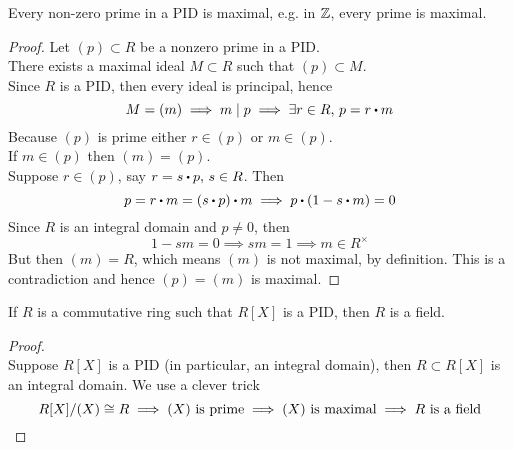 \documentclass[../Main.tex]{subfiles}
\begin{document}
\begin{thm}[title = Nonzero primes ideals are maximal in PID]
	Every non-zero prime in a PID is maximal, e.g. in $\mathbb{Z}$, every prime is maximal.
\end{thm}
\begin{proof}
	Let $(p)\subset R$ be a nonzero prime in a PID.\\
	There exists a maximal ideal $M\subset R $ such that $(p)\subset M$.\\
	Since $R$ is a PID, then every ideal is principal, hence
	\[M=(m) \implies m\mid p \implies \exists r\in R, \, p=r\rdot m\]
	Because $(p)$ is prime either $r\in (p)$ or $m \in (p)$.\\
	If $m\in (p)$ then $(m)=(p)$. \\
	Suppose $r\in (p)$, say $r=s\rdot p,\, s\in R$. Then 
	\[p=r\rdot m=(s\rdot p)\rdot m \implies p\rdot (1-s\rdot m)=0\]
	Since $R$ is an integral domain and $p\ne 0$, then 
	\[1-sm=0\implies sm =1 \implies  m\in R^\times\]
	But then $(m) = R$, which means $(m)$ is not maximal, by definition. This is a contradiction and hence 
	$(p)=(m)$
	is maximal.
\end{proof}
\begin{thm}[title = If \texorpdfstring{$R[X]$}{R[X]} is PID then \texorpdfstring{$R$}{R} is field]
	If $R$ is a commutative ring such that $R[X]$ is a PID, then $R$ is a field.
\end{thm}
\begin{proof}~\\
	Suppose $R[X]$ is a PID (in particular, an integral domain), then $R\subset R[X]$ is an integral domain. We use a clever trick
	\[R[X]/(X) \cong R \implies (X) \text{ is prime} \implies (X) \text{ is maximal} \implies R \text{ is a field}\qedhere\]
\end{proof}
\end{document}
